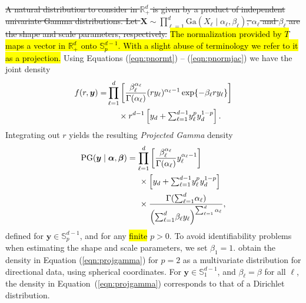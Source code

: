 \documentclass[iicol,sn-basic]{sn-jnl}
\theoremstyle{thmstyleone}
\begin{document}
\st{A natural  distribution to consider in ${\mathbb R}^d_+$ is given by a product of independent univariate Gamma distributions. Let $\bm{ X} \sim \prod_{\ell = 1}^d\text{Ga}\left(X_{\ell}\mid\alpha_{\ell},\beta_{\ell}\right)$, $\alpha_\ell$ and $\beta_\ell$ are the shape and scale parameters, respectively.}
\hl{The normalization provided by $T$ maps a vector in ${\mathbb R}_+^d$ onto
${\mathbb S}_p^{d-1} $. With a slight abuse of terminology we refer to it as a
projection.} Using Equations (\ref{eqn:pnormt}) -- (\ref{eqn:pnormjac}) we have the joint density
\begin{equation}
\label{joint}
\begin{aligned}
f(r,\bm{ y}) = &\prod_{\ell = 1}^{d}
\left[\frac{\beta_{\ell}^{\alpha_{\ell}}}{\Gamma(\alpha_{\ell})}(ry_{\ell})^{\alpha_{\ell} - 1}
\exp\lbrace-\beta_{\ell}ry_{\ell}\rbrace\right] \\
&\hspace{0.5cm}\times r^{d-1}\left[y_d +
{\textstyle \sum}_{\ell = 1}^{d-1}y_{\ell}^p y_d^{1 - p}\right].
\end{aligned}
\end{equation}
Integrating out $r$ yields the resulting \emph{Projected Gamma} density
\begin{equation}
\label{eqn:projgamma}
\begin{aligned}
\text{PG}(\bm{ y}\mid\bm{ \alpha},\bm{ \beta}) &=
\prod_{\ell = 1}^d\left[\frac{\beta_{\ell}^{\alpha_{\ell}}}{\Gamma(\alpha_{\ell})}
y_{\ell}^{\alpha_{\ell} - 1}\right]\\
&\hspace{0.5cm}\times \left[y_d +
{\textstyle \sum}_{\ell = 1}^{d-1}y_{\ell}^p y_d^{1 - p}\right]\\
&\hspace{0.5cm}\times \frac{\Gamma({\textstyle\sum}_{\ell = 1}^d\alpha_{\ell})}{\left({\textstyle\sum}_{\ell = 1}^d
\beta_{\ell}y_{\ell}\right)^{{\scriptstyle\sum_{\ell = 1}^d \alpha_{\ell}}}},
\end{aligned}
\end{equation}
defined for $\bm{y}\in {\mathbb S}_p^{d-1}$, and for any \hl{finite }$p>0$. To avoid identifiability problems when estimating the shape and scale parameters, we set $\beta_1 = 1$.  \cite{nunez2019} obtain the density in Equation (\ref{eqn:projgamma}) for $p=2$ as a multivariate distribution for directional data, using spherical coordinates.  For $\bm{ y}\in {\mathbb S}_1^{d-1}$, and $\beta_{\ell} = \beta$ for all $\ell$, the density in Equation~(\ref{eqn:projgamma}) corresponds to that of a Dirichlet distribution.
\end{document}
